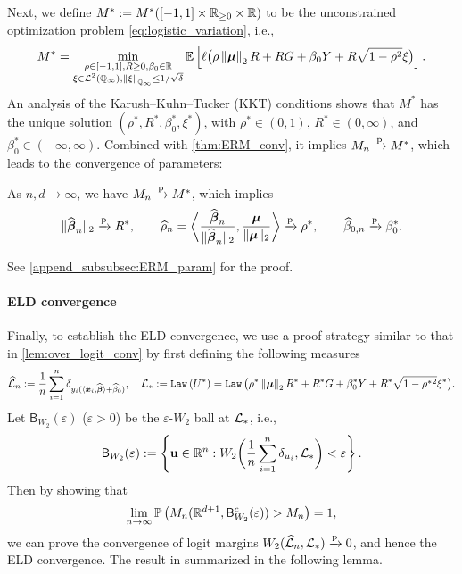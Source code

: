 Next, we define $M^* := M^*( [-1, 1] \times \mathbb{R}_{\ge 0} \times \mathbb{R} )$ to be the unconstrained optimization problem \cref{eq:logistic_variation}, i.e.,
\begin{equation*}
    M^{*}
    = \min_{ \substack{ \rho \in [-1, 1], R \ge 0, \beta_0 \in \mathbb{R} \\ \xi \in \mathcal{L}^2(\mathbb{Q}_\infty), \left\|{\xi}\right\|_{\mathbb{Q}_\infty} \le 1/\sqrt{\delta} } } 
    \mathbb{E} \left[ \ell \bigl( \rho\left\|{{\boldsymbol{\mu}}}\right\|_2 R + RG + \beta_0 Y + R\sqrt{1 - \rho^2} \xi \bigr) \right].
\end{equation*}
An analysis of the Karush--Kuhn--Tucker (KKT) conditions shows that $M^*$ has the unique solution $(\rho^*, R^*, \beta_0^*, \xi^*)$, with $\rho^* \in (0, 1)$, $R^* \in (0, \infty)$, and $\beta_0^* \in (-\infty, \infty)$. Combined with \cref{thm:ERM_conv}, it implies $M_n \xrightarrow{\mathrm{p}} M^*$, which leads to the convergence of parameters:
\begin{lem} 
\label{lem:ERM_param_conv}
As $n, d \to \infty$, we have $M_n \xrightarrow{\mathrm{p}} M^*$, which implies
    \begin{equation*}
            \| \widehat{{\boldsymbol{\beta}}}_n \|_2 \xrightarrow{\mathrm{p}} R^*,
            \qquad
            \widehat\rho_n = \biggl\langle \frac{\widehat {{\boldsymbol{\beta}}}_n}{\| \widehat {{\boldsymbol{\beta}}}_n \|_2}, \frac{{\boldsymbol{\mu}}}{\| {\boldsymbol{\mu}} \|_2} \biggr\rangle \xrightarrow{\mathrm{p}} \rho^*,
            \qquad
            \widehat\beta_{0,n} \xrightarrow{\mathrm{p}} \beta_0^*.
    \end{equation*}
\end{lem}
\noindent
See \cref{append_subsubsec:ERM_param} for the proof.

\paragraph{ELD convergence} Finally, to establish the ELD convergence, we use a proof strategy similar to that in \cref{lem:over_logit_conv} by first defining the following measures
\begin{align*}
    \widehat {\mathcal{L}}_{n} := \frac1n \sum_{i=1}^n \delta_{y_i ( \langle \text{\boldmath $x$}_i, \widehat{{\boldsymbol{\beta}}} \rangle + \widehat\beta_{0} ) }, 
    \quad
    \mathcal{L}_* := \mathtt{Law} \, (U^*)
    = \mathtt{Law} \, \bigl( \rho^*\left\|{{\boldsymbol{\mu}}}\right\|_2 R^* + R^* G + \beta_0^* Y + R^* \sqrt{1 - \rho^*{}^2} \xi^* \bigr).
\end{align*}
Let $\mathsf{B}_{W_2}(\varepsilon)$ ($\varepsilon > 0$) be the $\varepsilon$-$W_2$ ball at $\mathcal{L}_*$, i.e.,
\begin{equation*}
    \mathsf{B}_{W_2}(\varepsilon) := \left\{ \mathrm{\bf u} \in \mathbb{R}^n:   W_2 \biggl( 
        \frac{1}{n}\sum_{i=1}^n \delta_{u_i}, \mathcal{L}_*
     \biggr)  < \varepsilon \right\}.
\end{equation*}
Then by showing that
\begin{equation*}
    \lim_{n \to \infty} \mathbb{P} \left( M_n(\mathbb{R}^{d + 1}, \mathsf{B}_{W_2}^c(\varepsilon) ) > M_n \right) = 1,
\end{equation*}
we can prove the convergence of logit margins $W_2( \widehat {\mathcal{L}}_{n}, \mathcal{L}_* ) \xrightarrow{\mathrm{p}} 0$, and hence the ELD convergence. The result in summarized in the following lemma.

